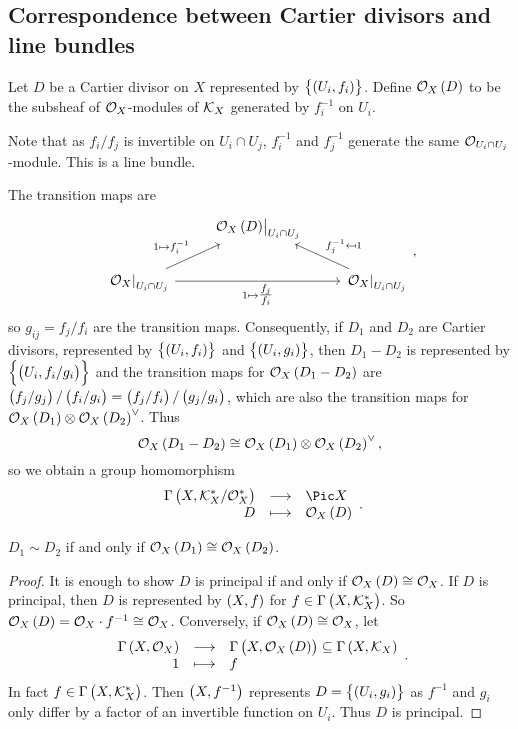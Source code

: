 \pagebreak

\subsection{Correspondence between Cartier divisors and line bundles}

\begin{definition*}
Let $ D $ be a Cartier divisor on $ X $ represented by $ \cbr{\br{U_i, f_i}} $. Define $ \OOO_X\br{D} $ to be the subsheaf of $ \mathcal{O}_X $-modules of $ \mathcal{K}_X $ generated by $ f_i^{-1} $ on $ U_i $.
\end{definition*}

Note that as $ f_i / f_j $ is invertible on $ U_i \cap U_j $, $ f_i^{-1} $ and $ f_j^{-1} $ generate the same $ \mathcal{O}_{U_i \cap U_j} $-module. This is a line bundle.

\begin{remark*}
The transition maps are
$$
\begin{tikzcd}
& \eval{\OOO_X\br{D}}_{U_i \cap U_j} & \\
\eval{\OOO_X}_{U_i \cap U_j} \arrow{ur}{1 \mapsto f_i^{-1}} \arrow{rr}[swap]{1 \mapsto \tfrac{f_j}{f_i}} & & \eval{\OOO_X}_{U_i \cap U_j} \arrow{ul}[swap]{f_j^{-1} \mapsfrom 1}
\end{tikzcd},
$$
so $ g_{ij} = f_j / f_i $ are the transition maps. Consequently, if $ D_1 $ and $ D_2 $ are Cartier divisors, represented by $ \cbr{\br{U_i, f_i}} $ and $ \cbr{\br{U_i, g_i}} $, then $ D_1 - D_2 $ is represented by $ \cbr{\br{U_i, f_i / g_i}} $ and the transition maps for $ \OOO_X\br{D_1 - D_2} $ are $ \br{f_j / g_j} / \br{f_i / g_i} = \br{f_j / f_i} / \br{g_j / g_i} $, which are also the transition maps for $ \OOO_X\br{D_1} \otimes \OOO_X\br{D_2}^\vee $. Thus
$$ \OOO_X\br{D_1 - D_2} \cong \OOO_X\br{D_1} \otimes \OOO_X\br{D_2}^\vee, $$
so we obtain a group homomorphism
$$ \function{\Gamma\br{X, \KKK_X^* / \OOO_X^*}}{\Pic X}{D}{\OOO_X\br{D}}. $$
\end{remark*}

\begin{lemma}
$ D_1 \sim D_2 $ if and only if $ \OOO_X\br{D_1} \cong \OOO_X\br{D_2} $.
\end{lemma}

\begin{proof}
It is enough to show $ D $ is principal if and only if $ \OOO_X\br{D} \cong \OOO_X $. If $ D $ is principal, then $ D $ is represented by $ \br{X, f} $ for $ f \in \Gamma\br{X, \KKK_X^*} $. So $ \OOO_X\br{D} = \OOO_X \cdot f^{-1} \cong \OOO_X $. Conversely, if $ \OOO_X\br{D} \cong \OOO_X $, let
$$ \function{\Gamma\br{X, \OOO_X}}{\Gamma\br{X, \OOO_X\br{D}} \subseteq \Gamma\br{X, \KKK_X}}{1}{f}. $$
In fact $ f \in \Gamma\br{X, \KKK_X^*} $. Then $ \br{X, f^{-1}} $ represents $ D = \cbr{\br{U_i, g_i}} $ as $ f^{-1} $ and $ g_i $ only differ by a factor of an invertible function on $ U_i $. Thus $ D $ is principal.
\end{proof}

